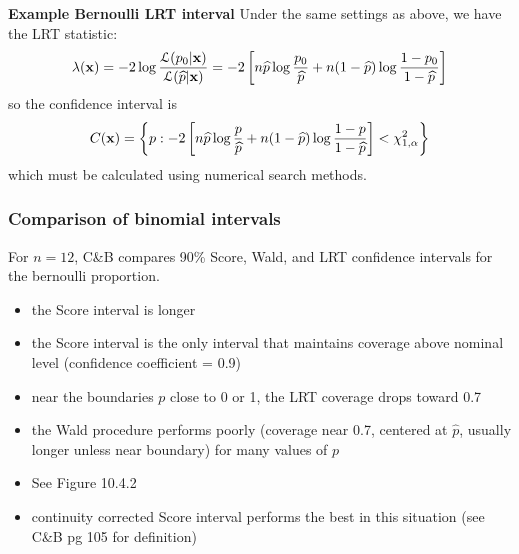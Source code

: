 \documentclass[11pt,]{article}
\def\bx{{\bf x}}
\def\phat{{\widehat p}}
\def\Lsc{{\cal L}}
\begin{document}
\noindent\textbf{Example Bernoulli LRT interval} Under the same settings
as above, we have the LRT statistic:
\[\lambda(\bx) =-2 \log \frac{\Lsc(p_0|\bx)}{\Lsc(\phat|\bx)} = -2 \left[ n\phat \log \frac{p_0}{\phat}  + n(1-\phat) \log\frac{1-p_0}{1-\phat} \right]\]
so the confidence interval is
\[C(\bx) = \left\{ p: -2 \left[ n\phat \log \frac{p}{\phat} + n(1-\phat) \log\frac{1-p}{1-\phat} \right] < \chi^2_{1,\alpha}\right\}\]
which must be calculated using numerical search methods.

\subsubsection{Comparison of binomial intervals}

For \(n=12\), C\&B compares 90\% Score, Wald, and LRT confidence
intervals for the bernoulli proportion.

\begin{itemize}
\item the Score interval is longer
\item the Score interval is the only interval that maintains coverage above nominal level (confidence coefficient = 0.9)
\item near the boundaries $p$ close to 0 or 1, the LRT coverage drops toward 0.7
\item the Wald procedure performs poorly (coverage near 0.7, centered at $\phat$, usually longer unless near boundary) for many values of $p$
\item See Figure 10.4.2
\item continuity corrected Score interval performs the best in this situation (see C\&B pg 105 for definition)
\end{itemize}
\end{document}
